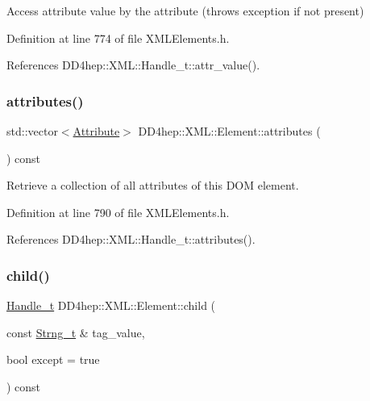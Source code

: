Access attribute value by the attribute (throws exception if not present) 



Definition at line 774 of file X\+M\+L\+Elements.\+h.



References D\+D4hep\+::\+X\+M\+L\+::\+Handle\+\_\+t\+::attr\+\_\+value().

\hypertarget{class_d_d4hep_1_1_x_m_l_1_1_element_ad05f4b2cf50610eb99d6de189ac9b697}{}\label{class_d_d4hep_1_1_x_m_l_1_1_element_ad05f4b2cf50610eb99d6de189ac9b697} 
\subsubsection{\texorpdfstring{attributes()}{attributes()}}
{\footnotesize\ttfamily std\+::vector$<$\hyperlink{namespace_d_d4hep_1_1_x_m_l_a5c19b7116be99d69b4b22d911357baaf}{Attribute}$>$ D\+D4hep\+::\+X\+M\+L\+::\+Element\+::attributes (\begin{DoxyParamCaption}{ }\end{DoxyParamCaption}) const\hspace{0.3cm}{\ttfamily [inline]}}



Retrieve a collection of all attributes of this D\+OM element. 



Definition at line 790 of file X\+M\+L\+Elements.\+h.



References D\+D4hep\+::\+X\+M\+L\+::\+Handle\+\_\+t\+::attributes().

\hypertarget{class_d_d4hep_1_1_x_m_l_1_1_element_ac41048246c8a1138d5d81ca0b51b6ae7}{}\label{class_d_d4hep_1_1_x_m_l_1_1_element_ac41048246c8a1138d5d81ca0b51b6ae7} 
\subsubsection{\texorpdfstring{child()}{child()}}
{\footnotesize\ttfamily \hyperlink{class_d_d4hep_1_1_x_m_l_1_1_handle__t}{Handle\+\_\+t} D\+D4hep\+::\+X\+M\+L\+::\+Element\+::child (\begin{DoxyParamCaption}\item[{const \hyperlink{class_d_d4hep_1_1_x_m_l_1_1_strng__t}{Strng\+\_\+t} \&}]{tag\+\_\+value,  }\item[{bool}]{except = {\ttfamily true} }\end{DoxyParamCaption}) const\hspace{0.3cm}{\ttfamily [inline]}}



